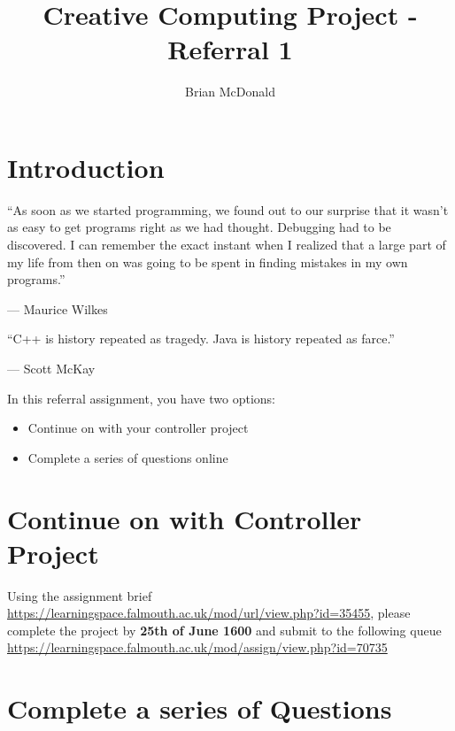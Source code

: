 \documentclass{../../../fal_assignment}
\title{Creative Computing Project - Referral 1}
\author{Brian McDonald}
\begin{document}
	
	\maketitle
	
	\section*{Introduction}
	
	\begin{marginquote}
		``As soon as we started programming, we found out to our surprise that it wasn't as easy to get programs right as we had thought. Debugging had to be discovered. I can remember the exact instant when I realized that a large part of my life from then on was going to be spent in finding mistakes in my own programs.''
		\par --- Maurice Wilkes
		\marginquoterule
		\par ``C++ is history repeated as tragedy. Java is history repeated as farce.''
		\par --- Scott McKay
	\end{marginquote}
	
	In this referral assignment, you have two options:
	
	\begin{itemize}
		\item Continue on with your controller project
		\item Complete a series of questions online 
	\end{itemize}

	\section*{Continue on with Controller Project}
	
	Using the assignment brief \url{https://learningspace.falmouth.ac.uk/mod/url/view.php?id=35455}, please complete the project by \textbf{25th of June 1600} and submit to the following queue \url{https://learningspace.falmouth.ac.uk/mod/assign/view.php?id=70735}
	
	\section*{Complete a series of Questions}
	
\end{document}
